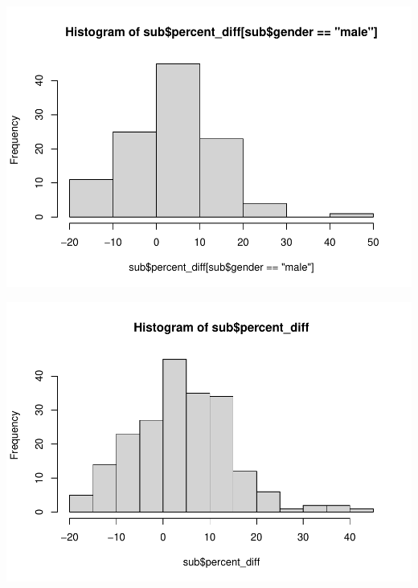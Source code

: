 \documentclass[]{article}
\newenvironment{Shaded}{\begin{snugshade}}{\end{snugshade}}
\newcommand{\KeywordTok}[1]{\textcolor[rgb]{0.13,0.29,0.53}{\textbf{#1}}}
\newcommand{\NormalTok}[1]{#1}
\newcommand{\OperatorTok}[1]{\textcolor[rgb]{0.81,0.36,0.00}{\textbf{#1}}}
\newcommand{\StringTok}[1]{\textcolor[rgb]{0.31,0.60,0.02}{#1}}
\begin{document}
\begin{Shaded}
\end{Shaded}

\includegraphics{project-measure-writeup-student_files/figure-latex/unnamed-chunk-3-2.pdf}

\begin{Shaded}
\end{Shaded}

\includegraphics{project-measure-writeup-student_files/figure-latex/unnamed-chunk-3-3.pdf}
\end{document}
